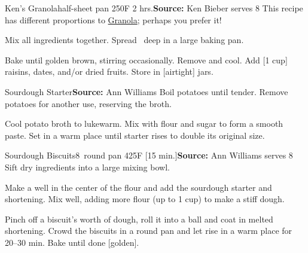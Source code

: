\begin{recipe}{Ken's Granola}{half-sheet pan \hfill 250\0F \hfill 2 hrs.}{\textbf{Source:} Ken Bieber \hfill serves 8}
 \freeform [CB] This recipe has different proportions to \hyperref[Granola]{Granola}; perhaps you prefer it!

 Mix all ingredients together. Spread \inch\ deep in a large baking pan.

 \newstep Bake until golden brown, stirring occasionally. Remove and cool. Add [1 cup] raisins, dates, and/or dried fruits. Store in [airtight] jars.
\end{recipe}

\begin{recipe}{Sourdough Starter}{}{\textbf{Source:} Ann Williams \hfill }
 Boil potatoes until tender. Remove potatoes for another use, reserving the broth.

 Cool potato broth to lukewarm. Mix with flour and sugar to form a smooth paste. Set in a warm place until starter rises to double its original size.
\end{recipe}

\begin{recipe}{Sourdough Biscuits}{8\inch\ round pan \hfill 425\0F \hfill [15 min.]}{\textbf{Source:} Ann Williams \hfill serves 8}
 Sift dry ingredients into a large mixing bowl.

 Make a well in the center of the flour and add the sourdough starter and shortening. Mix well, adding more flour (up to 1 cup) to make a stiff dough.

 Pinch off a biscuit's worth of dough, roll it into a ball and coat in melted shortening. Crowd the biscuits in a round pan and let rise in a warm place for 20--30 min. Bake until done [golden].
\end{recipe}

